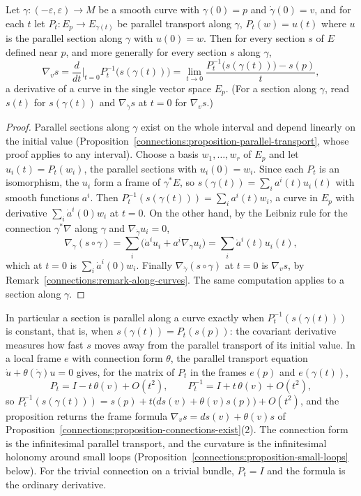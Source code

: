 \begin{proposition}\label{connections:proposition-connection-from-transport}
Let $\gamma \colon (-\varepsilon, \varepsilon) \to M$ be a smooth curve with $\gamma(0) = p$ and $\dot\gamma(0) = v$, and for each $t$ let $P_t \colon E_p \to E_{\gamma(t)}$ be parallel transport along $\gamma$,
$P_t(w) = u(t)$ where $u$ is the parallel section along $\gamma$ with $u(0) = w$. Then for every section $s$ of $E$ defined near $p$, and more generally for every section $s$ along $\gamma$,
\[
\nabla_vs = \frac{d}{dt}\Big|_{t=0}P_t^{-1}\bigl(s(\gamma(t))\bigr) = \lim_{t \to 0}\frac{P_t^{-1}\bigl(s(\gamma(t))\bigr) - s(p)}{t},
\]
a derivative of a curve in the single vector space $E_p$. (For a section along $\gamma$, read $s(t)$ for $s(\gamma(t))$ and $\nabla_{\dot\gamma}s$ at $t = 0$ for $\nabla_vs$.)
\end{proposition}

\begin{proof}
Parallel sections along $\gamma$ exist on the whole interval and depend linearly on the initial value (Proposition~\ref{connections:proposition-parallel-transport}, whose proof applies to any interval).
Choose a basis $w_1, \ldots, w_r$ of $E_p$ and let $u_i(t) = P_t(w_i)$, the parallel sections with $u_i(0) = w_i$. Since each $P_t$ is an isomorphism, the $u_i$ form a frame of $\gamma^*E$, so
$s(\gamma(t)) = \sum_ia^i(t)u_i(t)$ with smooth functions $a^i$. Then $P_t^{-1}(s(\gamma(t))) = \sum_ia^i(t)w_i$, a curve in $E_p$ with derivative $\sum_i\dot a^i(0)w_i$ at $t = 0$. On the other hand, by the
Leibniz rule for the connection $\gamma^*\nabla$ along $\gamma$ and $\nabla_{\dot\gamma}u_i = 0$,
\[
\nabla_{\dot\gamma}(s \circ \gamma) = \sum_i\bigl(\dot a^iu_i + a^i\nabla_{\dot\gamma}u_i\bigr) = \sum_i\dot a^i(t)u_i(t),
\]
which at $t = 0$ is $\sum_i\dot a^i(0)w_i$. Finally $\nabla_{\dot\gamma}(s \circ \gamma)$ at $t = 0$ is $\nabla_vs$, by Remark~\ref{connections:remark-along-curves}. The same computation applies to a section along $\gamma$.
\end{proof}

In particular a section is parallel along a curve exactly when $P_t^{-1}(s(\gamma(t)))$ is constant, that is, when $s(\gamma(t)) = P_t(s(p))$: the covariant derivative measures how fast $s$ moves away from
the parallel transport of its initial value. In a local frame $e$ with connection form $\theta$, the parallel transport equation $\dot u + \theta(\dot\gamma)u = 0$ gives, for the matrix of $P_t$ in the frames
$e(p)$ and $e(\gamma(t))$,
\[
P_t = I - t\,\theta(v) + O(t^2), \qquad P_t^{-1} = I + t\,\theta(v) + O(t^2),
\]
so $P_t^{-1}(s(\gamma(t))) = s(p) + t\bigl(ds(v) + \theta(v)s(p)\bigr) + O(t^2)$, and the proposition returns the frame formula $\nabla_vs = ds(v) + \theta(v)s$ of
Proposition~\ref{connections:proposition-connections-exist}(2). The connection form is the infinitesimal parallel transport, and the curvature is the infinitesimal holonomy around small loops
(Proposition~\ref{connections:proposition-small-loops} below). For the trivial connection on a trivial bundle, $P_t = I$ and the formula is the ordinary derivative.

